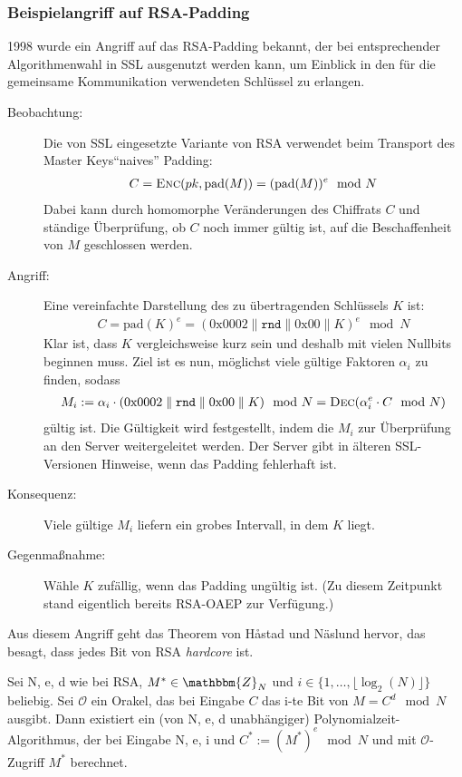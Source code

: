 \subsubsection{Beispielangriff auf RSA-Padding} 1998 wurde ein Angriff
auf das RSA-Padding bekannt, der bei entsprechender Algorithmenwahl in
SSL ausgenutzt werden kann, um Einblick in den für die gemeinsame
Kommunikation verwendeten Schlüssel zu erlangen.
\begin{description}
\item[Beobachtung:] Die von SSL eingesetzte Variante von RSA
  verwendet beim Transport des Master Keys\indexTLSMasterKey "`naives"'
  Padding:
  \begin{align*} C = \textsc{Enc}(pk, \text{pad}(M)) =
    (\text{pad}(M))^e \mod N
  \end{align*} Dabei kann durch homomorphe Veränderungen
  des Chiffrats $C$ und ständige Überprüfung, ob $C$ noch immer gültig
  ist, auf die Beschaffenheit von $M$ geschlossen werden.
\item[Angriff:] Eine vereinfachte Darstellung des zu
  übertragenden Schlüssels $K$ ist:
  \begin{align*} C = \text{pad}(K)^e =
    (0\mathrm{x}0002 \parallel \mathtt{rnd} \parallel
    0\mathrm{x}00 \parallel K)^e \mod N
  \end{align*} Klar ist, dass $K$ vergleichsweise kurz
  sein und deshalb mit vielen Nullbits beginnen muss. Ziel ist es nun,
  möglichst viele gültige Faktoren $\alpha_i$ zu finden, sodass
  \begin{align*} M_i := \alpha_i \cdot
    (0\mathrm{x}0002 \parallel \mathtt{rnd} \parallel
    0\mathrm{x}00 \parallel K) \mod N = \textsc{Dec}(\alpha_i^e \cdot C \mod N)
  \end{align*} gültig ist. Die Gültigkeit wird
  festgestellt, indem die $M_i$ zur Überprüfung an den Server
  weitergeleitet werden. Der Server gibt in älteren SSL-Versionen
  Hinweise, wenn das Padding fehlerhaft ist.
\item[Konsequenz:] Viele gültige $M_i$ liefern ein grobes
  Intervall, in dem $K$ liegt.
\item[Gegenmaßnahme:] Wähle $K$ zufällig, wenn das Padding
  ungültig ist. (Zu diesem Zeitpunkt stand eigentlich bereits RSA-OAEP zur
  Verfügung.)
\end{description} 
Aus diesem Angriff geht das Theorem von Håstad und Näslund hervor, das
besagt, dass jedes Bit von RSA \emph{hardcore} ist.
\begin{theorem} Sei N, e, d wie bei RSA, $M^* \in
\mathbbm{Z}_N$ und $i \in \{1, \ldots , \lfloor \log_2(N)\rfloor \}$
beliebig. Sei $\mathcal{O}$ ein Orakel, das bei Eingabe $C$ das i-te Bit
von $M = C^d \mod N$ ausgibt. Dann existiert ein (von N, e, d
unabhängiger) Polynomialzeit-Algorithmus, der bei Eingabe N, e, i und
$C^* := (M^*)^e \mod N$ und mit $\mathcal{O}$-Zugriff $M^*$ berechnet.
\end{theorem}

